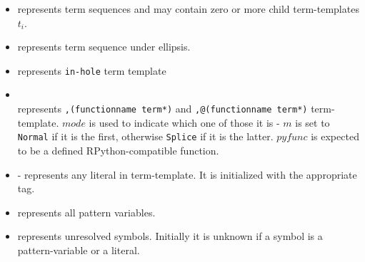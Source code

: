 \begin{itemize}
\item \TermSequence \space represents term sequences and may contain zero or more child term-templates $t_i$.
\item \TermRepeat \space represents term sequence under ellipsis.
\item \TermInHole \space represents \texttt{in-hole} term template
\item \PythonCall \\ represents \texttt{,(functionname term*)} and \texttt{,@(functionname term*)} term-template. $mode$ is used to indicate which one of those it is - $m$ is set to \texttt{Normal} if it is the first, otherwise \texttt{Splice} if it is the latter. $pyfunc$ is expected to be a defined RPython-compatible function.
\item \TermLiteral - represents any literal in term-template. It is initialized with the appropriate tag.
\item \PatternVariable \space represents all pattern variables.
\item \UnresolvedSymbol \space represents unresolved symbols. Initially it is unknown if a symbol is a pattern-variable or a literal.
\end{itemize}
